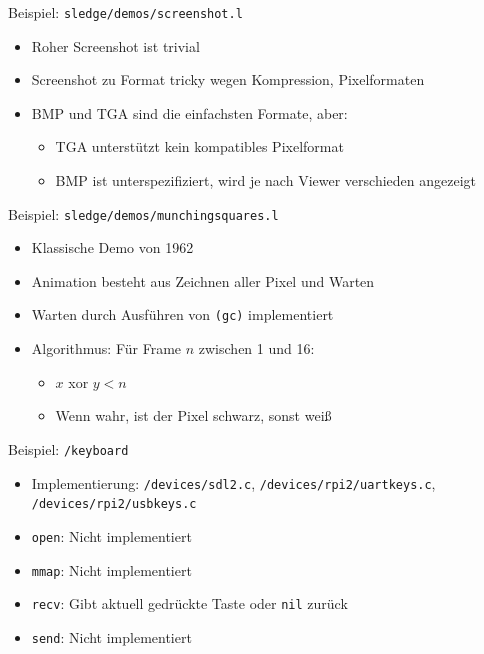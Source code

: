 \documentclass[presentation]{beamer}
\begin{document}
\begin{frame}[fragile,label=sec-4-10]{Beispiel: \texttt{sledge/demos/screenshot.l}}
 \begin{itemize}
\item Roher Screenshot ist trivial
\item Screenshot zu Format tricky wegen Kompression, Pixelformaten
\item BMP und TGA sind die einfachsten Formate, aber:
\begin{itemize}
\item TGA unterstützt kein kompatibles Pixelformat
\item BMP ist unterspezifiziert, wird je nach Viewer verschieden
angezeigt
\end{itemize}
\end{itemize}
\end{frame}

\begin{frame}[fragile,label=sec-4-11]{Beispiel: \texttt{sledge/demos/munchingsquares.l}}
 \begin{itemize}
\item Klassische Demo von 1962
\item Animation besteht aus Zeichnen aller Pixel und Warten
\item Warten durch Ausführen von \texttt{(gc)} implementiert
\item Algorithmus: Für Frame $n$ zwischen 1 und 16:
\begin{itemize}
\item $x$ xor $y < n$
\item Wenn wahr, ist der Pixel schwarz, sonst weiß
\end{itemize}
\end{itemize}
\end{frame}

\begin{frame}[fragile,label=sec-4-12]{Beispiel: \texttt{/keyboard}}
 \begin{itemize}
\item Implementierung: \texttt{/devices/sdl2.c}, \texttt{/devices/rpi2/uartkeys.c},
\texttt{/devices/rpi2/usbkeys.c}
\item \texttt{open}: Nicht implementiert
\item \texttt{mmap}: Nicht implementiert
\item \texttt{recv}: Gibt aktuell gedrückte Taste oder \texttt{nil} zurück
\item \texttt{send}: Nicht implementiert
\end{itemize}
\end{frame}
\end{document}

